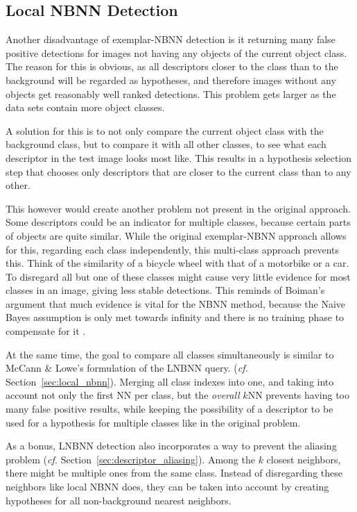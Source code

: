\subsection{Local NBNN Detection} %
\label{ssub:local_nbnn_detection}

Another disadvantage of exemplar-NBNN detection is it returning many false positive detections for images not having any objects of the current object class. The reason for this is obvious, as all descriptors closer to the class than to the background will be regarded as hypotheses, and therefore images without any objects get reasonably well ranked detections. This problem gets larger as the data sets contain more object classes.

A solution for this is to not only compare the current object class with the background class, but to compare it with all other classes, to see what each descriptor in the test image looks most like. This results in a hypothesis selection step that chooses only descriptors that are closer to the current class than to any other.

This however would create another problem not present in the original approach. Some descriptors could be an indicator for multiple classes, because certain parts of objects are quite similar. While the original exemplar-NBNN approach allows for this, regarding each class independently, this multi-class approach prevents this. Think of the similarity of a bicycle wheel with that of a motorbike or a car. To disregard all but one of these classes might cause very little evidence for most classes in an image, giving less stable detections. This reminds of Boiman's argument that much evidence is vital for the NBNN method, because the Naive Bayes assumption is only met towards infinity and there is no training phase to compensate for it \cite{boiman2008defense}.

At the same time, the goal to compare all classes simultaneously is similar to McCann \& Lowe's formulation of the LNBNN query. \cite{mccann2012local} (\emph{cf.} Section~\ref{sec:local_nbnn}). Merging all class indexes into one, and taking into account not only the first NN per class, but the \emph{overall} $k$NN prevents having too many false positive results, while keeping the possibility of a descriptor to be used for a hypothesis for multiple classes like in the original problem.

As a bonus, LNBNN detection also incorporates a way to prevent the aliasing problem (\emph{cf.} Section~\ref{sec:descriptor_aliasing}). Among the $k$ closest neighbors, there might be multiple ones from the same class. Instead of disregarding these neighbors like local NBNN does, they can be taken into account by creating hypotheses for all non-background nearest neighbors.

